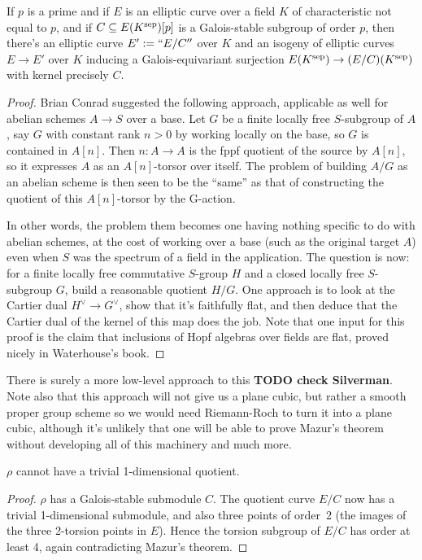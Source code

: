 \begin{theorem}\label{Elliptic_curve_quotient_by_finite_subgroup} If $p$ is a prime and
  if $E$ is an elliptic curve over a field $K$ of characteristic not equal to $p$,
   and if $C\subseteq E(K^{\operatorname{sep}})[p]$ is a Galois-stable
  subgroup of order $p$, then there's an elliptic curve $E':=``E/C''$ over $K$ and an isogeny of elliptic 
  curves $E\to E'$ over $K$ inducing a Galois-equivariant surjection $E(K^{\operatorname{sep}})\to (E/C)(K^{\operatorname{sep}})$ 
  with kernel precisely $C$.
\end{theorem}
\begin{proof}
  Brian Conrad suggested the following approach, applicable as well for abelian schemes $A\to S$ 
  over a base.  Let $G$ be a finite locally free $S$-subgroup of $A$, say $G$ with constant 
  rank $n > 0$ by working locally on the base, so $G$ is contained in $A[n]$.  Then 
  $n: A \to A$ is the fppf quotient of the source by $A[n]$, so it expresses $A$ as an 
  $A[n]$-torsor over itself.  The problem of building $A/G$ as an abelian scheme is then 
  seen to be the “same” as that of constructing the quotient of this $A[n]$-torsor by the G-action.

  In other words, the problem them becomes one having nothing specific to do with abelian schemes, 
  at the cost of working over a base (such as the original target $A$) even when $S$ was the 
  spectrum of a field in the application. The question is now: for a finite locally free 
  commutative $S$-group $H$ and a closed locally free $S$-subgroup $G$, build a reasonable quotient 
  $H/G$. One approach is to look at the Cartier dual $H^\vee\to G^\vee$, show that it's faithfully 
  flat, and then deduce that the Cartier dual of the kernel of this map does the job. Note that 
  one input for this proof is the claim that inclusions of Hopf algebras over fields are flat, 
  proved nicely in Waterhouse’s book.
\end{proof}

There is surely a more low-level approach to this {\bf TODO check Silverman}. Note also that this approach will not
give us a plane cubic, but rather a smooth proper group scheme so we would need Riemann-Roch
to turn it into a plane cubic, although it's unlikely that one will be able to prove Mazur's
theorem without developing all of this machinery and much more.

\begin{corollary}\label{Frey_curve_no_trivial_quotient} $\rho$ cannot have a trivial 1-dimensional quotient.
\end{corollary}
\begin{proof} $\rho$ has a Galois-stable submodule $C$. The quotient curve $E/C$ now has
  a trivial 1-dimensional submodule, and also three points of order~2 (the images of the three
  2-torsion points in $E$). Hence the torsion subgroup of $E/C$ has order at least 4\ell{}, 
  again contradicting Mazur's theorem.
\end{proof}

